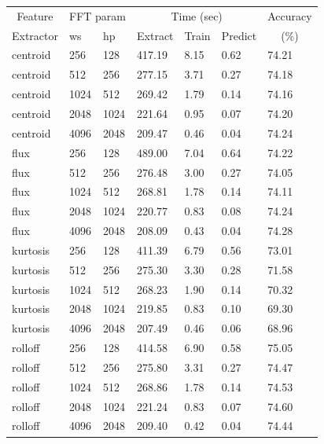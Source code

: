 \begin{table}
\begin{tabular}{|l|l|l|l|l|l|l|}
\hline
\multicolumn{1}{|c|}{Feature} &\multicolumn{2}{c|}{FFT param} & \multicolumn{3}{c|}{Time (sec)} & Accuracy \\
\hhline{|~|-|-|-|-|-|~|}
Extractor & ws & hp & Extract & Train & Predict & \multicolumn{1}{c|}{(\%)} \\
\hhline{|=|=|=|=|=|=|=|}
centroid & 256 & 128    &   417.19  &    8.15  &   0.62  &  74.21  \\
centroid & 512 & 256    &   277.15  &    3.71  &   0.27  &  74.18  \\
centroid & 1024 & 512   &   269.42  &    1.79  &   0.14  &  74.16  \\
centroid & 2048 & 1024  &   221.64  &    0.95  &   0.07  &  74.20  \\
centroid & 4096 & 2048  &   209.47  &    0.46  &   0.04  &  74.24  \\
\hline
flux & 256 & 128        &   489.00  &    7.04  &   0.64  &  74.22  \\
flux & 512 & 256        &   276.48  &    3.00  &   0.27  &  74.05  \\
flux & 1024 & 512       &   268.81  &    1.78  &   0.14  &  74.11  \\
flux & 2048 & 1024      &   220.77  &    0.83  &   0.08  &  74.24  \\
flux & 4096 & 2048      &   208.09  &    0.43  &   0.04  &  74.28  \\
\hline
kurtosis & 256 & 128    &   411.39  &    6.79  &   0.56  &  73.01  \\
kurtosis & 512 & 256    &   275.30  &    3.30  &   0.28  &  71.58  \\
kurtosis & 1024 & 512   &   268.23  &    1.90  &   0.14  &  70.32  \\
kurtosis & 2048 & 1024  &   219.85  &    0.83  &   0.10  &  69.30  \\
kurtosis & 4096 & 2048  &   207.49  &    0.46  &   0.06  &  68.96  \\
\hline
rolloff & 256 & 128     &   414.58  &    6.90  &   0.58  &  75.05  \\
rolloff & 512 & 256     &   275.80  &    3.31  &   0.27  &  74.47  \\
rolloff & 1024 & 512    &   268.86  &    1.78  &   0.14  &  74.53  \\
rolloff & 2048 & 1024   &   221.24  &    0.83  &   0.07  &  74.60  \\
rolloff & 4096 & 2048   &   209.40  &    0.42  &   0.04  &  74.44  \\

\end{tabular}
\end{table}
